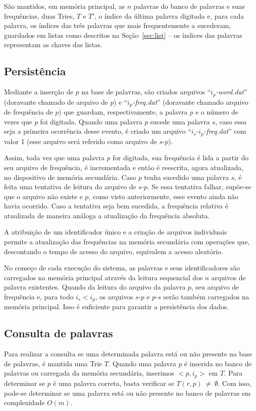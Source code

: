 \documentclass[12pt]{article}
\begin{document}
    São mantidos, em memória principal, as $n$ palavras do banco de palavras e suas frequências, duas Tries, $T$ e $T'$, o índice da última palavra digitada e, para cada palavra, os índices das três palavras que mais frequentemente a sucederam, guardados em listas como descritos na Seção~\ref{sec:list} -- os índices das palavras representam as chaves das listas.

    \subsection{Persistência}
    Mediante a inserção de $p$ na base de palavras, são criados arquivos ``$i_p$\emph{-word.dat}'' (doravante chamado de arquivo de $p$) e ``$i_p$\emph{-freq.dat}'' (doravante chamado arquivo de frequência de $p$) que guardam, respectivamente, a palavra $p$ e o número de vezes que $p$ foi digitada.
    Quando uma palavra $p$ sucede uma palavra $s$, caso essa seja a primeira ocorrência desse evento, é criado um arquivo ``$i_s$-$i_p$\emph{-freq.dat}'' com valor 1 (esse arquivo será referido como arquivo de $s$-$p$).

    Assim, toda vez que uma palavra $p$ for digitada, sua frequência é lida a partir do seu arquivo de frequência, é incrementada e então é reescrita, agora atualizada, no dispositivo de memória secundária.
    Caso $p$ tenha sucedido uma palavra $s$, é feita uma tentativa de leitura do arquivo de $s$-$p$.
    Se essa tentativa falhar, supõe-se que o arquivo não existe e $p$, como visto anteriormente, esse evento ainda não havia ocorrido.
    Caso a tentativa seja bem sucedida, a frequência relativa é atualizada de maneira análoga a atualização da frequência absoluta.

    A atribuição de um identificador único e a criação de arquivos individuais permite a atualização das frequências na memória secundária com operações que, descontando o tempo de acesso do arquivo, equivalem a acesso aleatório.

    No começo de cada execução do sistema, as palavras e seus identificadores são carregados na memória principal através da leitura sequencial dos $n$ arquivos de palavra existentes.
    Quando da leitura do arquivo da palavra $p$, seu arquivo de frequência e, para todo $i_s < i_p$, os arquivos $s$-$p$ e $p$-$s$ serão também carregados na memória principal.
    Isso é suficiente para garantir a persistência dos dados.

    \subsection{Consulta de palavras}
    Para realizar a consulta se uma determinada palavra está ou não presente na base de palavras, é mantida uma Trie $T$.
    Quando uma palavra $p$ é inserida no banco de palavras ou carregada da memória secundária, inserimos $<p, i_p>$ em $T$.
    Para determinar se $p$ é uma palavra correta, basta verificar se $T(r, p)~\ne~\emptyset$.
    Com isso, pode-se determinar se uma palavra está ou não presente no banco de palavras em complexidade $O(m)$.
\end{document}
